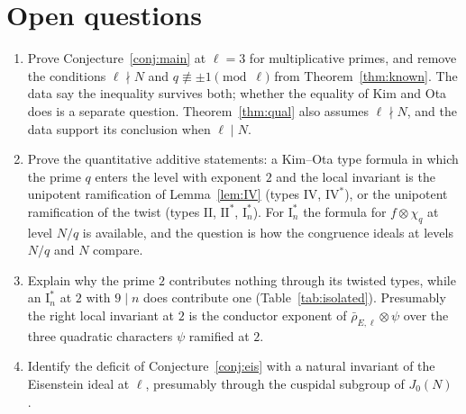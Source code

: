 \documentclass[11pt]{amsart}
\theoremstyle{definition}
\begin{document}
\section{Open questions}
\begin{enumerate}
\item Prove Conjecture~\ref{conj:main} at $\ell=3$ for multiplicative primes, and remove the conditions $\ell\nmid N$ and $q\not\equiv\pm1\pmod\ell$ from Theorem~\ref{thm:known}. The data say the inequality survives both; whether the equality of Kim and Ota does is a separate question. Theorem~\ref{thm:qual} also assumes $\ell\nmid N$, and the data support its conclusion when $\ell\mid N$.
\item Prove the quantitative additive statements: a Kim--Ota type formula in which the prime $q$ enters the level with exponent $2$ and the local invariant is the unipotent ramification of Lemma~\ref{lem:IV} (types $\mathrm{IV}$, $\mathrm{IV}^*$), or the unipotent ramification of the twist (types $\mathrm{II}$, $\mathrm{II}^*$, $\mathrm{I}_n^*$). For $\mathrm{I}_n^*$ the formula for $f\otimes\chi_q$ at level $N/q$ is available, and the question is how the congruence ideals at levels $N/q$ and $N$ compare.
\item Explain why the prime $2$ contributes nothing through its twisted types, while an $\mathrm{I}_n^*$ at $2$ with $9\mid n$ does contribute one (Table~\ref{tab:isolated}). Presumably the right local invariant at $2$ is the conductor exponent of $\bar\rho_{E,\ell}\otimes\psi$ over the three quadratic characters $\psi$ ramified at $2$.
\item Identify the deficit of Conjecture~\ref{conj:eis} with a natural invariant of the Eisenstein ideal at $\ell$, presumably through the cuspidal subgroup of $J_0(N)$ \cite{Mazur77}.
\end{enumerate}

\appendix
\end{document}
